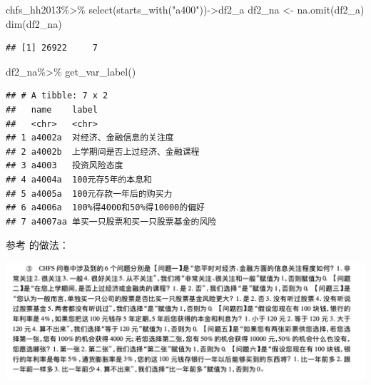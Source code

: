 \documentclass[
  oneside]{book}
\newenvironment{Shaded}{\begin{snugshade}}{\end{snugshade}}
\newcommand{\FunctionTok}[1]{\textcolor[rgb]{0.00,0.00,0.00}{#1}}
\newcommand{\NormalTok}[1]{#1}
\newcommand{\OtherTok}[1]{\textcolor[rgb]{0.56,0.35,0.01}{#1}}
\newcommand{\SpecialCharTok}[1]{\textcolor[rgb]{0.00,0.00,0.00}{#1}}
\newcommand{\StringTok}[1]{\textcolor[rgb]{0.31,0.60,0.02}{#1}}
\begin{document}
\begin{Shaded}
\begin{Highlighting}[]
\NormalTok{chfs\_hh2013}\SpecialCharTok{\%\textgreater{}\%}
  \FunctionTok{select}\NormalTok{(}\FunctionTok{starts\_with}\NormalTok{(}\StringTok{"a400"}\NormalTok{))}\OtherTok{{-}\textgreater{}}\NormalTok{df2\_a}
\NormalTok{df2\_na }\OtherTok{\textless{}{-}} \FunctionTok{na.omit}\NormalTok{(df2\_a) }
\FunctionTok{dim}\NormalTok{(df2\_na)}
\end{Highlighting}
\end{Shaded}

\begin{verbatim}
## [1] 26922     7
\end{verbatim}

\begin{Shaded}
\begin{Highlighting}[]
\NormalTok{df2\_na}\SpecialCharTok{\%\textgreater{}\%}
  \FunctionTok{get\_var\_label}\NormalTok{()}
\end{Highlighting}
\end{Shaded}

\begin{verbatim}
## # A tibble: 7 x 2
##   name    label                             
##   <chr>   <chr>                             
## 1 a4002a  对经济、金融信息的关注度          
## 2 a4002b  上学期间是否上过经济、金融课程    
## 3 a4003   投资风险态度                      
## 4 a4004a  100元存5年的本息和                
## 5 a4005a  100元存款一年后的购买力           
## 6 a4006a  100%得4000和50%得10000的偏好      
## 7 a4007aa 单买一只股票和买一只股票基金的风险
\end{verbatim}

参考 \textcite{ZhangGoDong2016} 的做法：

\includegraphics{image/fin-know2.png}
\end{document}
